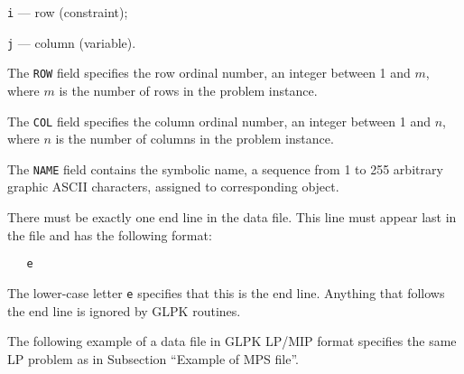 \verb|i| --- row (constraint);

\verb|j| --- column (variable).

The \verb|ROW| field specifies the row ordinal number, an integer
between 1 and $m$, where $m$ is the number of rows in the problem
instance.

The \verb|COL| field specifies the column ordinal number, an integer
between 1 and $n$, where $n$ is the number of columns in the problem
instance.

The \verb|NAME| field contains the symbolic name, a sequence from 1 to
255 arbitrary graphic ASCII characters, assigned to corresponding
object.

 There must be exactly one end line in the data file.
This line must appear last in the file and has the following format:

\begin{verbatim}
   e
\end{verbatim}

The lower-case letter \verb|e| specifies that this is the end line.
Anything that follows the end line is ignored by GLPK routines.

\newpage


The following example of a data file in GLPK LP/MIP format specifies
the same LP problem as in Subsection ``Example of MPS file''.

\bigskip

